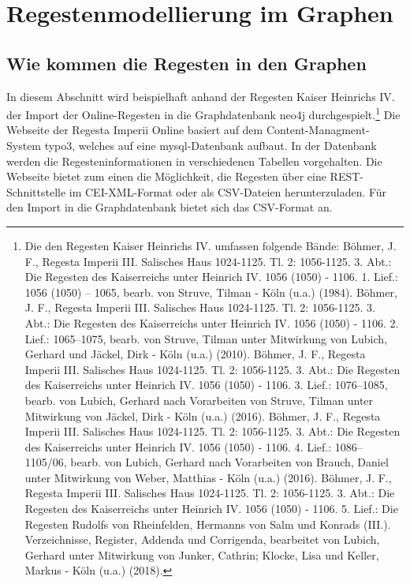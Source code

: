 \documentclass[ngerman,]{scrreprt}
\begin{document}
\hypertarget{regestenmodellierung-im-graphen}{%
\chapter{Regestenmodellierung im Graphen}\label{regestenmodellierung-im-graphen}}

\hypertarget{wie-kommen-die-regesten-in-den-graphen}{%
\section{Wie kommen die Regesten in den Graphen}\label{wie-kommen-die-regesten-in-den-graphen}}

In diesem Abschnitt wird beispielhaft anhand der Regesten Kaiser Heinrichs IV. der Import der Online-Regesten in die Graphdatenbank neo4j durchgespielt.\footnote{Die den Regesten Kaiser Heinrichs IV. umfassen folgende Bände: Böhmer, J. F., Regesta Imperii III. Salisches Haus 1024-1125. Tl. 2: 1056-1125. 3. Abt.: Die Regesten des Kaiserreichs unter Heinrich IV. 1056 (1050) - 1106. 1. Lief.: 1056 (1050) -- 1065, bearb. von Struve, Tilman - Köln (u.a.) (1984). Böhmer, J. F., Regesta Imperii III. Salisches Haus 1024-1125. Tl. 2: 1056-1125. 3. Abt.: Die Regesten des Kaiserreichs unter Heinrich IV. 1056 (1050) - 1106. 2. Lief.: 1065--1075, bearb. von Struve, Tilman unter Mitwirkung von Lubich, Gerhard und Jäckel, Dirk - Köln (u.a.) (2010). Böhmer, J. F., Regesta Imperii III. Salisches Haus 1024-1125. Tl. 2: 1056-1125. 3. Abt.: Die Regesten des Kaiserreichs unter Heinrich IV. 1056 (1050) - 1106. 3. Lief.: 1076--1085, bearb. von Lubich, Gerhard nach Vorarbeiten von Struve, Tilman unter Mitwirkung von Jäckel, Dirk - Köln (u.a.) (2016). Böhmer, J. F., Regesta Imperii III. Salisches Haus 1024-1125. Tl. 2: 1056-1125. 3. Abt.: Die Regesten des Kaiserreichs unter Heinrich IV. 1056 (1050) - 1106. 4. Lief.: 1086--1105/06, bearb. von Lubich, Gerhard nach Vorarbeiten von Brauch, Daniel unter Mitwirkung von Weber, Matthias - Köln (u.a.) (2016). Böhmer, J. F., Regesta Imperii III. Salisches Haus 1024-1125. Tl. 2: 1056-1125. 3. Abt.: Die Regesten des Kaiserreichs unter Heinrich IV. 1056 (1050) - 1106. 5. Lief.: Die Regesten Rudolfs von Rheinfelden, Hermanns von Salm und Konrads (III.). Verzeichnisse, Register, Addenda und Corrigenda, bearbeitet von Lubich, Gerhard unter Mitwirkung von Junker, Cathrin; Klocke, Lisa und Keller, Markus - Köln (u.a.) (2018).} Die Webseite der Regesta Imperii Online basiert auf dem Content-Managment-System typo3, welches auf eine mysql-Datenbank aufbaut. In der Datenbank werden die Regesteninformationen in verschiedenen Tabellen vorgehalten. Die Webseite bietet zum einen die Möglichkeit, die Regesten über eine REST-Schnittstelle im CEI-XML-Format oder als CSV-Dateien herunterzuladen. Für den Import in die Graphdatenbank bietet sich das CSV-Format an.
\end{document}
